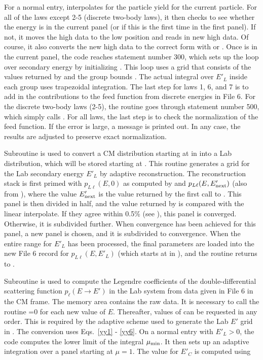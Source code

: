 For a normal entry,  interpolates for the particle yield
for the current particle.  For all of the laws except 2-5 (discrete
two-body laws), it then checks to see whether the energy  is
in the current panel (or if this is the first time in the first panel).
If not, it moves the high data to the low position and reads in new
high data.  Of course, it also converts the new high data to the correct
form with  or
.  Once  is in the
current panel, the code reaches statement number 300, which sets up the
loop over secondary energy by initializing
.  This loop
uses a grid that consists of the  values returned by
 and the group bounds .  The actual integral
over $E'_L$ inside each group uses trapezoidal integration.  The last
step for laws 1, 6, and 7 is to add in the contributions to the feed
function from discrete energies in File 6.  For the discrete two-body
laws (2-5), the routine goes through statement number 500, which
simply calls .  For all laws, the last step is to check
the normalization of the feed function.  If the error is large, a
message is printed out.  In any case, the results are adjusted to
preserve exact normalization.

Subroutine  is used to convert
a CM distribution starting at  in  into a
Lab distribution, which will be stored starting at .  This
routine generates a grid for the
Lab secondary energy $E'_L$ by adaptive reconstruction.  The
reconstruction stack is first primed with
$p_{L\ell}(E,0)$ as computed by  and
$p_{L\ell}(E,E'_{\rm next})$ (also from ), where
the value $E'_{\rm next}$ is the value  returned by the
first call to .  This panel is then divided in half, and
the value returned by  is compared with the linear
interpolate.  If they agree within 0.5\% (see ), this panel
is converged.  Otherwise, it is subdivided further.  When convergence
has been achieved for this panel, a new panel is chosen, and it is
subdivided to convergence.  When the entire range for $E'_L$ has been
processed, the final parameters are loaded into the new File 6 record
for $p_{L\ell}(E,E'_L)$ (which starts at  in ),
and the routine returns to .

Subroutine  is used to compute
the Legendre coefficients of the double-differential scattering
function $p_\ell(E{\rightarrow}E')$ in the Lab system from
data given in File 6 in the CM frame.  The memory area
 contains the raw data.  It is necessary to call the
routine =0 for each new value of $E$.  Thereafter, values
of  can be requested in any order.  This is required by the
adaptive scheme used to generate the Lab $E'$ grid in .
The conversion uses Eqs.~\ref{yy1} - \ref{yy6}.  On a normal entry
with $E'_L{>}0$, the code computes the lower limit of the integral
$\mu_{\rm min}$.  It then sets up an adaptive integration over a panel
starting at $\mu{=}1$. The value for $E'_C$ is computed using


